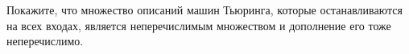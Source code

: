 Покажите, что множество описаний машин Тьюринга, которые останавливаются на всех входах, является
неперечислимым множеством и дополнение его тоже неперечислимо.
